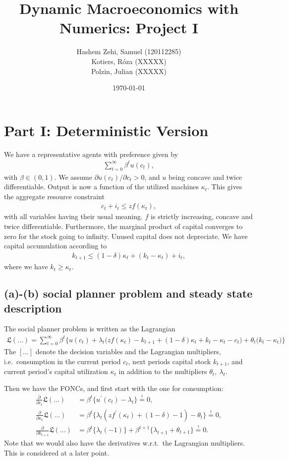 \documentclass[a4paper]{article}
\title{Dynamic Macroeconomics with Numerics: Project I}
\author{Hashem Zehi, Samuel (120112285)\\Kotiers, Róza (XXXXX)\\Polzin, Julian (XXXXX)} %
\date{\today}
\theoremstyle{definition}
\begin{document}
\maketitle
\newpage
\section{Part I: Deterministic Version}
We have a representative agents with preference given by
	\begin{align*}
	\sum\limits_{t=0}^{\infty} \beta^t u(c_t),
	\end{align*}
with $\beta \in (0,1)$. We assume $\partial u(c_t)/\partial c_t > 0$, and $u$ being concave and twice differentiable. Output is now a function of the utilized machines $\kappa_t$. This gives the aggregate resource constraint
	\begin{align*}
	c_t + i_t \leq z f(\kappa_t),
	\end{align*}	
with all variables having their usual meaning. $f$ is strictly increasing, concave and twice differentiable. Furthermore, the marginal product of capital converges to zero for the stock going to infinity. Unused capital does not depreciate. We have capital accumulation according to 
	\begin{align*}
	k_{t+1} \leq (1-\delta)\kappa_t + (k_t - \kappa_t)+i_t,
	\end{align*}	
where we have $k_t \geq \kappa_t$. 
\subsection{(a)-(b) social planner problem and steady state description}
The social planner problem is written as the Lagrangian
	\begin{align*}
	\mathfrak L(\dots) = \sum\limits_{t=0}^{\infty} \beta^t \Bigg\{ u(c_t) + \lambda_t \Big(z f(\kappa_t)- k_{t+1}
+(1-\delta)\kappa_t+k_t - \kappa_t -c_t \Big)+ \theta_t \Big( k_t - \kappa_t \Big) \Bigg\}
	\end{align*}
The $[\dots]$ denote the decision variables and the Lagrangian multipliers, i.e.\ consumption in the current period $c_t$, next periods capital stock $k_{t+1}$, and current period's capital utilization $\kappa_t$ in addition to the multipliers $\theta_t,\ \lambda_t$. 
	
Then we have the FONCs, and first start with the one for consumption:
	\begin{align}
	\frac{\partial}{\partial c_t}\mathfrak L(\dots) 			&= \beta^t \Big\{ u^\prime(c_t)-\lambda_t \Big\} \overset{!}{=}0, \\
	\frac{\partial}{\partial \kappa_t}\mathfrak L(\dots)		&= \beta^t \Big\{ \lambda_t( z f^\prime(\kappa_t)+(1-\delta)-1)-\theta_t \Big\} \overset{!}{=} 0, \\
	\frac{\partial}{\partial k_{t+1}}\mathfrak L(\dots)		&= \beta^t \Big\{ \lambda_t(-1) \Big\} + \beta^{t+1} \Big\{ \lambda_{t+1}+\theta_{t+1} \Big\} \overset{!}{=}0. 
	\end{align}
Note that we would also have the derivatives w.r.t.\ the Lagrangian multipliers. This is considered at a later point.	
	
\end{document}
